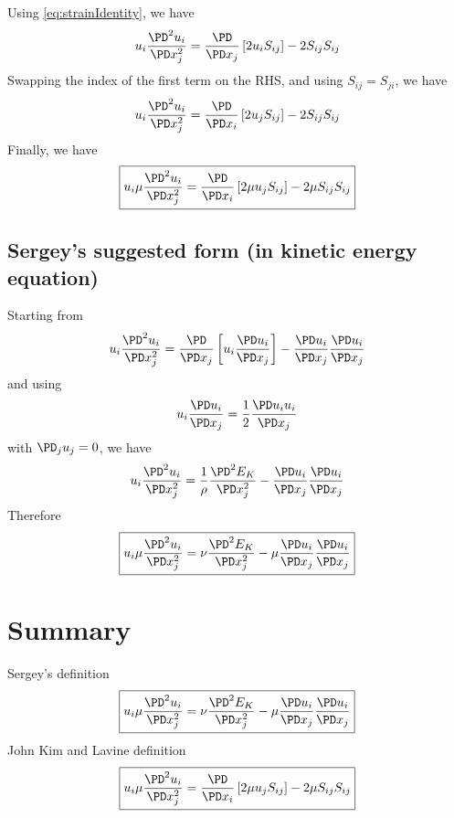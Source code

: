 \documentclass[11pt]{article}
\begin{document}
Using \ref{eq:strainIdentity}, we have
\begin{equation}
	u_i \frac{\PD^2 u_i}{\PD x_j^2} =
	\frac{\PD}{\PD x_j} \left[ 2 u_i S_{ij} \right] -
	2 S_{ij} S_{ij}
\end{equation}
Swapping the index of the first term on the RHS, and using $S_{ij}=S_{ji}$, we have
\begin{equation}
	u_i \frac{\PD^2 u_i}{\PD x_j^2} =
	\frac{\PD}{\PD x_i} \left[ 2 u_j S_{ij} \right] -
	2 S_{ij} S_{ij}
\end{equation}
Finally, we have
\begin{equation}
	\boxed{
	u_i \mu \frac{\PD^2 u_i}{\PD x_j^2} =
	\frac{\PD}{\PD x_i} \left[ 2 \mu u_j S_{ij} \right] -
	2 \mu S_{ij} S_{ij}
	}
\end{equation}

\subsection{Sergey's suggested form (in kinetic energy equation)}
Starting from
\begin{equation}
	u_i \frac{\PD^2 u_i}{\PD x_j^2} =
	\frac{\PD}{\PD x_j} \left[ u_i \frac{\PD u_i}{\PD x_j} \right] -
	\frac{\PD u_i}{\PD x_j}\frac{\PD u_i}{\PD x_j}
\end{equation}
and using
\begin{equation}
	u_i \frac{\PD u_i}{\PD x_j} =
	\frac{1}{2} \frac{\PD u_i u_i}{\PD x_j}
\end{equation}
with $\PD_j u_j = 0$, we have
\begin{equation}
	u_i \frac{\PD^2 u_i}{\PD x_j^2} =
	\frac{1}{\rho} \frac{\PD^2 E_K}{\PD x_j^2} -
	\frac{\PD u_i}{\PD x_j}\frac{\PD u_i}{\PD x_j}
\end{equation}
Therefore
\begin{equation}
	\boxed{
	u_i \mu \frac{\PD^2 u_i}{\PD x_j^2} =
	\nu \frac{\PD^2 E_K}{\PD x_j^2} -
	\mu \frac{\PD u_i}{\PD x_j}\frac{\PD u_i}{\PD x_j}
	}
\end{equation}

\section{Summary}
Sergey's definition
\begin{equation}
	\boxed{
	u_i \mu \frac{\PD^2 u_i}{\PD x_j^2} =
	\nu \frac{\PD^2 E_K}{\PD x_j^2} -
	\mu \frac{\PD u_i}{\PD x_j}\frac{\PD u_i}{\PD x_j}
	}
\end{equation}
John Kim and Lavine definition
\begin{equation}
	\boxed{
	u_i \mu \frac{\PD^2 u_i}{\PD x_j^2} =
	\frac{\PD}{\PD x_i} \left[ 2 \mu u_j S_{ij} \right] -
	2 \mu S_{ij} S_{ij}
	}
\end{equation}
\end{document}
